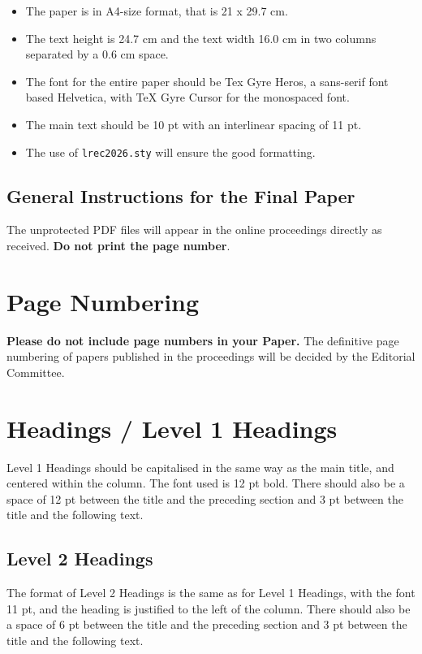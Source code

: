 \documentclass[10pt, a4paper]{article}
\begin{document}
\begin{itemize}
\item The paper is in A4-size format, that is 21 x 29.7 cm.
\item The text height is 24.7 cm and the text width 16.0 cm in two
  columns separated by a 0.6 cm space.
\item The font for the entire paper should be Tex Gyre Heros, a
  sans-serif font based Helvetica, with TeX Gyre Cursor for the
  monospaced font.
\item The main text should be 10 pt with an interlinear spacing of 11
  pt.
\item The use of \texttt{lrec2026.sty} will ensure the good formatting.
\end{itemize}



\subsection{General Instructions for the Final Paper}

The unprotected PDF files will appear in the online proceedings directly as received. \textbf{Do not print the page number}.

\section{Page Numbering}

\textbf{Please do not include page numbers in your Paper.} The definitive page numbering of papers published in the proceedings will be decided by the Editorial Committee.

\section{Headings / Level 1 Headings} 

Level 1 Headings should be capitalised in the same way as the main title, and centered within the column. The font used is 12 pt bold. There should also be a space of 12 pt between the title and the preceding section and 3 pt between the title and the following text.

\subsection{Level 2 Headings}

The format of Level 2 Headings is the same as for Level 1 Headings, with the font  11 pt, and the heading is justified to the left of the column. There should also be a space of 6 pt between the title and the preceding section and 3 pt between the title and the following text.
\end{document}
